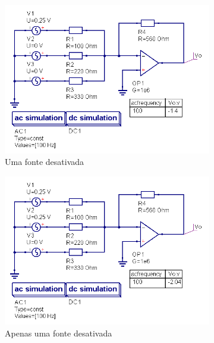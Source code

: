 \begin{figure}[H]
 \begin{subfigure}{.45\textwidth}
        \centering
        \includegraphics[width=\textwidth]{imagens/CircuitoB/-1_4.png}
        \caption{Uma fonte desativada}
        \label{fig:2_fon_des}
    \end{subfigure}    
    \begin{subfigure}{.45\textwidth}
        \centering
        \includegraphics[width=\textwidth]{imagens/CircuitoB/-2_04.png}
        \caption{Apenas uma fonte desativada}
        \label{fig:1_fon_des}
    \end{subfigure}
    \centering
    \begin{subfigure}{.45\textwidth}
        \centering

\end{subfigure}
\end{figure}
